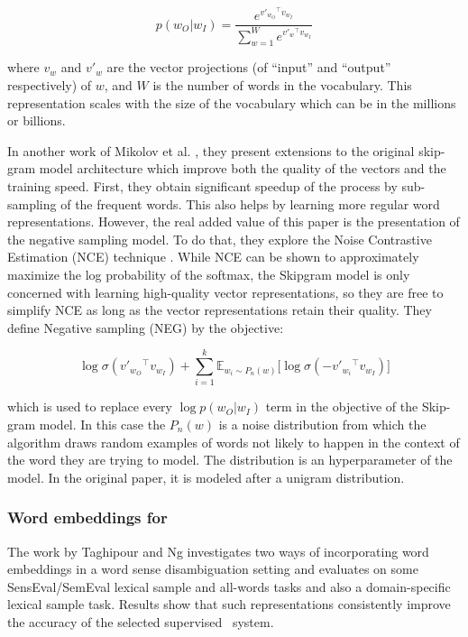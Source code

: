 \[
  p(w_O|w_I) =
  \frac{e^{v'_{w_O}{}^{\top} v_{w_I}}}
    {\sum^{W}_{w=1} e^{v'_{w}{}^{\top} v_{w_I}}}
\]

where $v_w$ and $v'_w$ are the vector projections (of ``input'' and ``output''
respectively) of $w$, and $W$ is the number of words in the vocabulary. This
representation scales with the size of the vocabulary which can be in the
millions or billions.

In another work of Mikolov et al. \cite{Mikolov2013a}, they present extensions
to the original skip-gram model architecture which improve both the quality of
the vectors and the training speed. First, they obtain significant speedup of
the process by sub-sampling of the frequent words. This also helps by learning
more regular word representations. However, the real added value of this paper
is the presentation of the negative sampling model. To do that, they explore
the Noise Contrastive Estimation (NCE) technique
\cite{Gutmann:2012:NEU:2188385.2188396}. While NCE  can be shown to
approximately maximize the log probability of the softmax, the Skipgram model
is only concerned with learning high-quality vector representations, so they
are free to simplify NCE as long as the vector representations retain their
quality. They define Negative sampling (NEG) by the objective:

\[
  \log\sigma(v'_{w_O}{}^{\top} v_{w_I}) +
  \sum^{k}_{i=1} \mathbb{E}_{w_i\sim P_n(w)} 
  \Big[ \log\sigma(-v'_{w_i}{}^{\top} v_{w_I}) \Big]
\]

which is used to replace every $\log p(w_O|w_I)$ term in the objective of the
Skip-gram model. In this case the $P_n(w)$ is a noise distribution from which
the algorithm draws random examples of words not likely to happen in the
context of the word they are trying to model. The distribution is an
hyperparameter of the model. In the original paper, it is modeled after a
unigram distribution.

\subsubsection{Word embeddings for \wsd}

The work by Taghipour and Ng \cite{Taghipour2015SemiSupervisedWS} investigates
two ways of incorporating word embeddings in a word sense disambiguation
setting and evaluates on some SensEval/SemEval lexical sample and all-words
tasks and also a domain-specific lexical sample task. Results show that such
representations consistently improve the accuracy of the selected supervised
\wsd~system.

